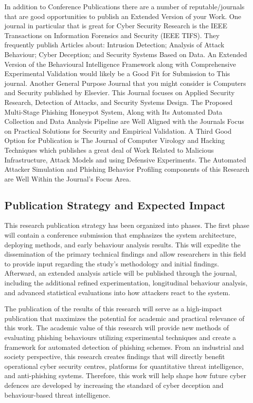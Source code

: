In addition to Conference Publications there are a number of reputable/journals that are good opportunities to publish an Extended Version of your Work. One journal in particular that is great for Cyber Security Research is the IEEE Transactions on Information Forensics and Security (IEEE TIFS). They frequently publish Articles about: Intrusion Detection; Analysis of Attack Behaviour; Cyber Deception; and Security Systems Based on Data. An Extended Version of the Behavioural Intelligence Framework along with Comprehensive Experimental Validation would likely be a Good Fit for Submission to This journal.
Another General Purpose Journal that you might consider is Computers and Security published by Elsevier. This Journal focuses on Applied Security Research, Detection of Attacks, and Security Systems Design. The Proposed Multi-Stage Phishing Honeypot System, Along with Its Automated Data Collection and Data Analysis Pipeline are Well Aligned with the Journals Focus on Practical Solutions for Security and Empirical Validation.
A Third Good Option for Publication is The Journal of Computer Virology and Hacking Techniques which publishes a great deal of Work Related to Malicious Infrastructure, Attack Models and using Defensive Experiments. The Automated Attacker Simulation and Phishing Behavior Profiling components of this Research are Well Within the Journal's Focus Area.

\subsection{Publication Strategy and Expected Impact}

This research publication strategy has been organized into phases. The first phase will contain a conference submission that emphasizes the system architecture, deploying methods, and early behaviour analysis results. This will expedite the dissemination of the primary technical findings and allow researchers in this field to provide input regarding the study’s methodology and initial findings. Afterward, an extended analysis article will be published through the journal, including the additional refined experimentation, longitudinal behaviour analysis, and advanced statistical evaluations into how attackers react to the system.

The publication of the results of this research will serve as a high-impact publication that maximizes the potential for academic and practical relevance of this work. The academic value of this research will provide new methods of evaluating phishing behaviours utilizing experimental techniques and create a framework for automated detection of phishing schemes. From an industrial and society perspective, this research creates findings that will directly benefit operational cyber security centres, platforms for quantitative threat intelligence, and anti-phishing systems. Therefore, this work will help shape how future cyber defences are developed by increasing the standard of cyber deception and behaviour-based threat intelligence.

